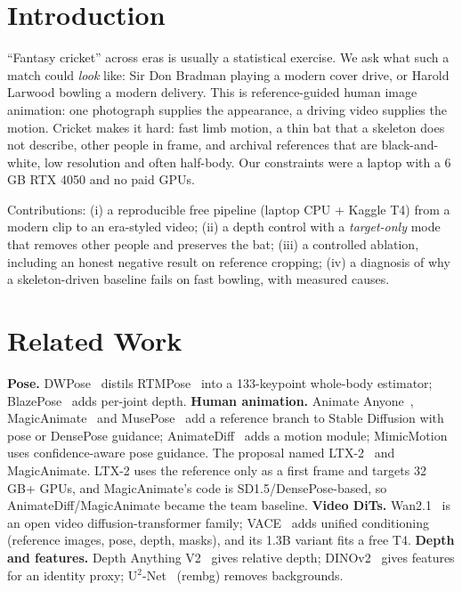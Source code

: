 \section{Introduction}
``Fantasy cricket'' across eras is usually a statistical exercise. We ask what such a match could \emph{look} like:
Sir Don Bradman playing a modern cover drive, or Harold Larwood bowling a modern delivery. This is reference-guided human
image animation: one photograph supplies the appearance, a driving video supplies the motion. Cricket makes it hard:
fast limb motion, a thin bat that a skeleton does not describe, other people in frame, and archival references that are
black-and-white, low resolution and often half-body. Our constraints were a laptop with a 6\,GB RTX 4050 and no paid
GPUs.

Contributions: (i) a reproducible free pipeline (laptop CPU + Kaggle T4) from a modern clip to an era-styled video;
(ii) a depth control with a \emph{target-only} mode that removes other people and preserves the bat; (iii) a controlled
ablation, including an honest negative result on reference cropping; (iv) a diagnosis of why a skeleton-driven baseline
fails on fast bowling, with measured causes.

\section{Related Work}
\textbf{Pose.} DWPose~\cite{yang2023dwpose} distils RTMPose~\cite{jiang2023rtmpose} into a 133-keypoint whole-body
estimator; BlazePose~\cite{bazarevsky2020blazepose} adds per-joint depth. \textbf{Human animation.} Animate
Anyone~\cite{hu2023animateanyone}, MagicAnimate~\cite{xu2023magicanimate} and MusePose~\cite{musepose2024} add a
reference branch to Stable Diffusion with pose or DensePose guidance; AnimateDiff~\cite{guo2023animatediff} adds a motion
module; MimicMotion~\cite{zhang2024mimicmotion} uses confidence-aware pose guidance. The proposal named
LTX-2~\cite{ltx2} and MagicAnimate. LTX-2 uses the reference only as a first frame and targets 32\,GB+ GPUs, and
MagicAnimate's code is SD1.5/DensePose-based, so AnimateDiff/MagicAnimate became the team baseline.
\textbf{Video DiTs.} Wan2.1~\cite{wan2025} is an open video diffusion-transformer family; VACE~\cite{jiang2025vace}
adds unified conditioning (reference images, pose, depth, masks), and its 1.3B variant fits a free T4.
\textbf{Depth and features.} Depth Anything V2~\cite{yang2024depthanythingv2} gives relative depth;
DINOv2~\cite{oquab2023dinov2} gives features for an identity proxy; U$^2$-Net~\cite{qin2020u2net} (rembg) removes
backgrounds.

